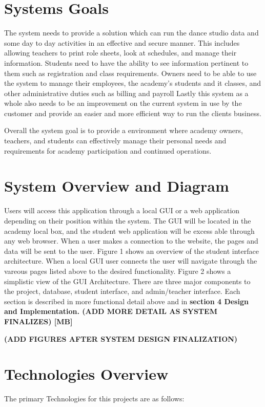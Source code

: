 \section{Systems Goals}
The system needs to provide a solution which can run the dance studio data and some day to day activities in an effective and secure manner. This includes allowing teachers to print role sheets, look at schedules, and manage their information. Students need to have the ability to see information pertinent to them such as registration and class requirements. Owners need to be able to use the system to manage their employees, the academy's students and it classes, and other administrative duties such as billing and payroll  Lastly this system as a whole also needs to be an improvement on the current system in use by the customer and provide an easier and more efficient way to run the clients business.

Overall the system goal is to provide a environment where academy owners, teachers, and students can effectively manage their personal needs and requirements for academy participation and continued operations.

\section{System Overview and Diagram}
\textmd{Users will access this application through a local GUI or a web application depending on their position within the system. The GUI will be located in the academy local box, and the student web application will be excess able through any web browser.
When a user makes a connection to the website, the pages and data will be sent to the user. Figure 1 shows an overview of the student interface architecture.
When a local GUI user connects the user will navigate through the vareous pages listed above to the desired functionality. Figure 2 shows a simplistic view of the GUI Architecture.
There are three major components to the project, database, student interface, and admin/teacher interface.  Each section is described in more functional detail above and in} \bf section 4 Design and Implementation.
\bf (ADD MORE DETAIL AS SYSTEM FINALIZES) [MB]


\bf(ADD FIGURES AFTER SYSTEM DESIGN FINALIZATION)


\section{Technologies Overview}
\textmd{The primary Technologies for this projects are as follows:}


